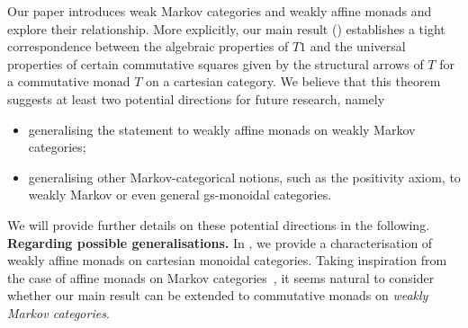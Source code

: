 \documentclass[a4paper,UKenglish,numberwithinsect,cleveref, autoref, thm-restate]{lipics-v2021}
\theoremstyle{plain} %
\theoremstyle{definition} %
\begin{document}
Our paper introduces weak Markov categories and weakly affine monads and explore their relationship.
More explicitly, our main result () establishes a tight correspondence between the algebraic properties 
of $T1$ and the universal properties of certain commutative squares given by the structural arrows of $T$
for a commutative monad $T$ on a cartesian category.
We believe that this theorem suggests at least two potential directions for future research, namely
\begin{itemize}
\item generalising the statement to weakly affine monads on weakly Markov categories;
\item generalising other Markov-categorical notions, such as the positivity axiom, to weakly Markov or even general gs-monoidal categories.
\end{itemize} 
We will provide further details on these potential directions in the following.
\\

\textbf{Regarding possible generalisations.} In , we provide a characterisation of weakly affine monads on cartesian monoidal categories. Taking inspiration from the case of affine monads on Markov categories~\cite[Corollary~3.2]{Fritz_2020}, it seems natural to consider whether our main result can be extended to commutative monads on \emph{weakly Markov categories}.
\end{document}
